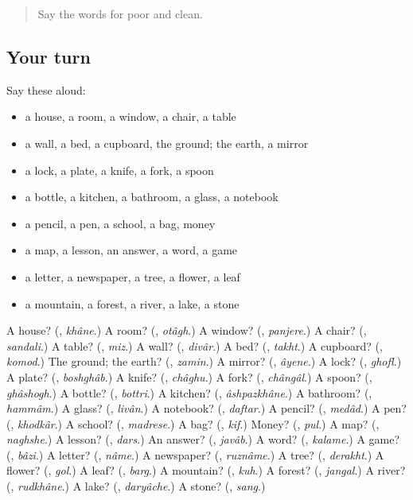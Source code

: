 \begin{quote}
Say the words for poor and clean.
\end{quote}

\subsection*{Your turn}
Say these aloud:

\begin{itemize}
\raggedright
  \item a house, a room, a window, a chair, a table
  \item a wall, a bed, a cupboard, the ground; the earth, a mirror
  \item a lock, a plate, a knife, a fork, a spoon
  \item a bottle, a kitchen, a bathroom, a glass, a notebook
  \item a pencil, a pen, a school, a bag, money
  \item a map, a lesson, an answer, a word, a game
  \item a letter, a newspaper, a tree, a flower, a leaf
  \item a mountain, a forest, a river, a lake, a stone
\end{itemize}

\begin{tcolorbox}[breakable,colback=teal!4,colframe=teal!35!black,title={Before you move on}]
A house? (\textbf{}, \emph{khâne}.) A room? (\textbf{}, \emph{otâgh}.) A window? (\textbf{}, \emph{panjere}.) A chair? (\textbf{}, \emph{sandali}.) A table? (\textbf{}, \emph{miz}.) A wall? (\textbf{}, \emph{divâr}.) A bed? (\textbf{}, \emph{takht}.) A cupboard? (\textbf{}, \emph{komod}.) The ground; the earth? (\textbf{}, \emph{zamin}.) A mirror? (\textbf{}, \emph{âyene}.) A lock? (\textbf{}, \emph{ghofl}.) A plate? (\textbf{}, \emph{boshghâb}.) A knife? (\textbf{}, \emph{châghu}.) A fork? (\textbf{}, \emph{chângâl}.) A spoon? (\textbf{}, \emph{ghâshogh}.) A bottle? (\textbf{}, \emph{bottri}.) A kitchen? (\textbf{}, \emph{âshpazkhâne}.) A bathroom? (\textbf{}, \emph{hammâm}.) A glass? (\textbf{}, \emph{livân}.) A notebook? (\textbf{}, \emph{daftar}.) A pencil? (\textbf{}, \emph{medâd}.) A pen? (\textbf{}, \emph{khodkâr}.) A school? (\textbf{}, \emph{madrese}.) A bag? (\textbf{}, \emph{kif}.) Money? (\textbf{}, \emph{pul}.) A map? (\textbf{}, \emph{naghshe}.) A lesson? (\textbf{}, \emph{dars}.) An answer? (\textbf{}, \emph{javâb}.) A word? (\textbf{}, \emph{kalame}.) A game? (\textbf{}, \emph{bâzi}.) A letter? (\textbf{}, \emph{nâme}.) A newspaper? (\textbf{}, \emph{ruznâme}.) A tree? (\textbf{}, \emph{derakht}.) A flower? (\textbf{}, \emph{gol}.) A leaf? (\textbf{}, \emph{barg}.) A mountain? (\textbf{}, \emph{kuh}.) A forest? (\textbf{}, \emph{jangal}.) A river? (\textbf{}, \emph{rudkhâne}.) A lake? (\textbf{}, \emph{daryâche}.) A stone? (\textbf{}, \emph{sang}.)
\end{tcolorbox}
